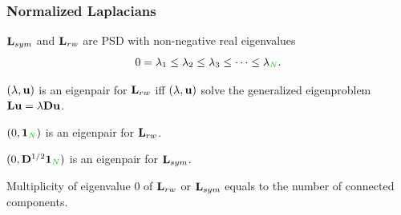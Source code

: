 \documentclass{beamer}
\begin{document}

\newcommand{\topictitle}{Laplacian and Random Walks}

\newcommand{\topicsubtitle}{Stationary Distribution}

\MakeTopicSlide

\begin{frame}
\frametitle{Normalized Laplacians}

\begin{block}{}
$\mathbf{L}_{sym}$ and $\mathbf{L}_{rw}$ are PSD with non-negative real eigenvalues 
\vspace{-0.25cm}
$$0 = \lambda_1 \leq \lambda_2 \leq \lambda_3 \leq \dots \leq \lambda_\nodes.$$
\vspace{-0.5cm} 
\end{block}


\begin{block}{}
$(\lambda,\mathbf{u})$ is an eigenpair for $\mathbf{L}_{rw}$ iff $(\lambda,\mathbf{u})$
solve the generalized eigenproblem $\mathbf{L} \mathbf{u} = \lambda \mathbf{D} \mathbf{u}$.
\end{block}\pause

\begin{block}{}
$(0,\bOne_\nodes)$ is an eigenpair for $\mathbf{L}_{rw}$.
\end{block}\pause

\begin{block}{}
$(0,\bD^{1/2}\bOne_\nodes)$ is an eigenpair for $\mathbf{L}_{sym}$.
\end{block}\pause

\begin{block}{}
Multiplicity of eigenvalue 0 of $\mathbf{L}_{rw}$ or $\mathbf{L}_{sym}$ equals
to the number of connected components.
\end{block}\pause
\begin{flushright}
\end{flushright}

\end{frame}
\end{document}
